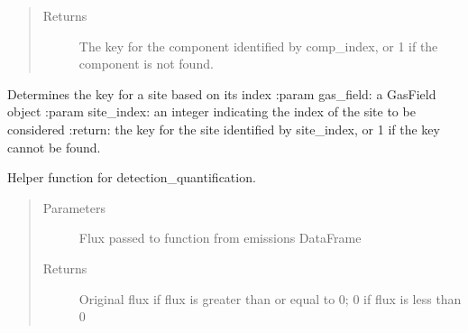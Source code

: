 \documentclass[letterpaper,10pt,english]{sphinxmanual}
\begin{document}
\begin{fulllineitems}
\begin{fulllineitems}
\begin{quote}
\begin{description}
\begin{itemize}
\end{itemize}

\item[{Returns}] \leavevmode
The key for the component identified by comp\_index, or \sphinxhyphen{}1 if the component is not found.

\end{description}\end{quote}

\end{fulllineitems}


\begin{fulllineitems}
\label{\detokenize{index:feast.DetectionModules.abstract_detection_method.DetectionMethod.find_site_name}}
Determines the key for a site based on its index
:param gas\_field: a GasField object
:param site\_index: an integer indicating the index of the site to be considered
:return: the key for the site identified by site\_index, or \sphinxhyphen{}1 if the key cannot be found.

\end{fulllineitems}


\begin{fulllineitems}
\label{\detokenize{index:feast.DetectionModules.abstract_detection_method.DetectionMethod.flux_val}}
Helper function for detection\_quantification.
\begin{quote}\begin{description}
\item[{Parameters}] \leavevmode
{} \textendash{} Flux passed to function from emissions DataFrame

\item[{Returns}] \leavevmode
Original flux if flux is greater than or equal to 0; 0 if flux is less than 0

\end{description}\end{quote}


\end{fulllineitems}
\end{fulllineitems}
\end{document}
